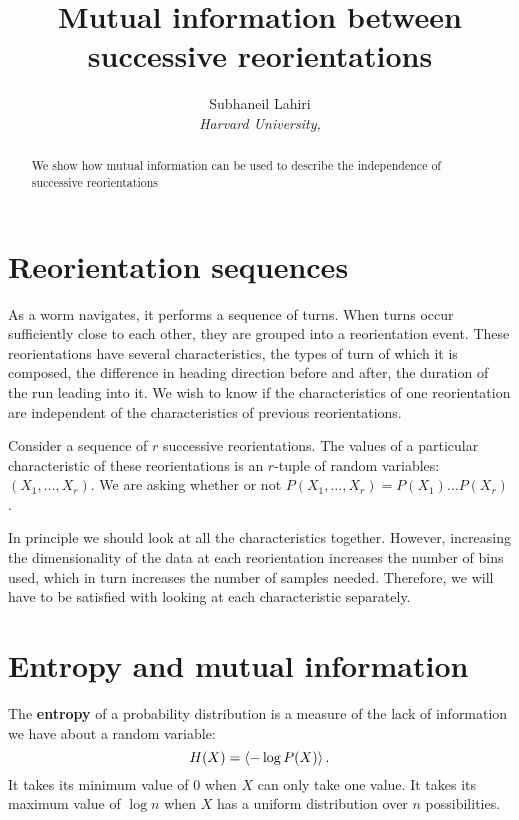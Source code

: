 \documentclass[12pt]{article}
\title{Mutual information between successive reorientations}
\author{Subhaneil Lahiri
\\
%
%
\small{\emph{Harvard University,}}
%
}
\begin{document}
\maketitle





\begin{abstract}
  We show how mutual information can be used to describe the independence of successive reorientations
\end{abstract}



\section{Reorientation sequences}\label{sec:reoseq}

As a worm navigates, it performs a sequence of turns. When turns occur sufficiently close to each other, they are grouped into a reorientation event. These reorientations have several characteristics, \eg the types of turn of which it is composed, the difference in heading direction before and after, the duration of the run leading into it. We wish to know if the characteristics of one reorientation are independent of the characteristics of previous reorientations.

Consider a sequence of $r$ successive reorientations. The values of a particular characteristic of these reorientations is an $r$-tuple of random variables: $(X_1,\ldots,X_r)$. We are asking whether or not $P(X_1,\ldots,X_r) = P(X_1)\ldots P(X_r)$.

In principle we should look at all the characteristics together. However, increasing the dimensionality of the data at each reorientation increases the number of bins used, which in turn increases the number of samples needed. Therefore, we will have to be satisfied with looking at each characteristic separately.

\section{Entropy and mutual information}\label{sec:entropy}

The \textbf{entropy} of a probability distribution is a measure of the lack of information we have about a random variable:
%
\begin{equation}\label{eq:ent}
  H(X) = \left\langle -\log P(X) \right\rangle.
\end{equation}
%
It takes its minimum value of $0$ when $X$ can only take one value. It takes its maximum value of $\log n$ when $X$ has a uniform distribution over $n$ possibilities.
\end{document}
